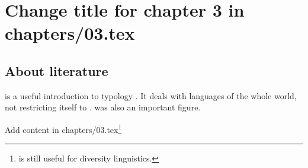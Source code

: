 \chapter{Change title for chapter 3 in chapters/03.tex}

\section{About literature}
\citet{Comrie1981} is a useful introduction to typology . %
It deals with languages of the whole world, not restricting itself to . %
 was also an important figure. %

Add content in chapters/03.tex\footnote{\citet{Comrie1981} is still useful for diversity linguistics. }